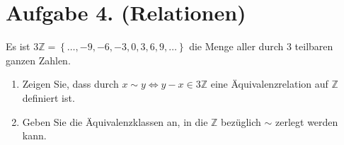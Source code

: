 \documentclass[german,12pt]{homework}
\newcommand{\ZZ}{\mathbb{Z}}
\begin{document}
    \section*{Aufgabe 4. (Relationen)}

    \begin{problem}
        Es ist \(3\ZZ = \left\{\ldots, -9, -6, -3, 0, 3, 6, 9,
        \ldots\right\}\) die Menge aller durch \(3\) teilbaren ganzen Zahlen.
        \begin{enumerate}
            \item Zeigen Sie, dass durch \(x \sim y \iff y - x \in
            3\ZZ\) eine Äquivalenzrelation auf \(\ZZ\) definiert
            ist.
            \item Geben Sie die Äquivalenzklassen an, in die \(\ZZ\)
            bezüglich \(\sim\) zerlegt werden kann.
        \end{enumerate}
    \end{problem}
\end{document}

